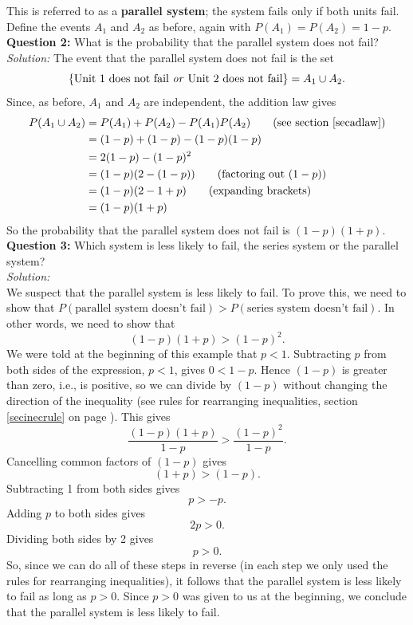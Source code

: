 \noindent This is referred to as a \textbf{parallel system}; the system fails only if both units fail. Define the events $A_1$ and $A_2$ as before, again with $P(A_1) = P(A_2) = 1-p$. \\

\noindent \textbf{Question 2:} What is the probability that the parallel system does not fail? \\

\noindent \textit{Solution:}
The event that the parallel system does not fail is the set
\[
\left\{\text{Unit 1 does not fail \textit{or} Unit 2 does not fail}\right\} = A_1 \cup A_2.
\]
Since, as before, $A_1$ and $A_2$ are independent, the addition law gives
\begin{align*}
P(A_1 \cup A_2) & = P(A_1) + P(A_2) - P(A_1)P(A_2) \tag{see section \ref{secadlaw}} \\
			& = (1-p) + (1-p)  - (1-p)(1-p) \\
			& = 2(1-p) - (1-p)^2 \\
			& = (1-p)(2 - (1-p)) \tag{factoring out $(1-p)$} \\
			& = (1-p)(2 - 1 + p) \tag{expanding brackets} \\
			& = (1-p)(1 + p)
\end{align*}
So the probability that the parallel system does not fail is $(1-p)(1+p).$ \\

\noindent \textbf{Question 3:} Which system is less likely to fail, the series system or the parallel system? \\

\noindent \textit{Solution:} \\
We suspect that the parallel system is less likely to fail. To prove this, we need to show that $P(\text{parallel system doesn't fail}) > P(\text{series system doesn't fail})$. In other words, we need to show that
\[
(1-p)(1+p) > (1-p)^2. \tag{using results from questions 1 and 2}
\]
We were told at the beginning of this example that $p < 1$. Subtracting $p$ from both sides of the expression, $p < 1$, gives $0 < 1 - p$. Hence $(1-p)$ is greater than zero, i.e., is positive, so we can divide by $(1-p)$ without changing the direction of the inequality (see rules for rearranging inequalities, section \ref{secinecrule} on page \pageref{secinecrule}). This gives
\[
\frac{(1-p)(1+p)}{1-p} > \frac{(1-p)^2}{1-p}.
\]
Cancelling common factors of $(1-p)$ gives
\[
(1+p) > (1-p).
\]
Subtracting 1 from both sides gives
\[
p > -p.
\]
Adding $p$ to both sides gives
\[
2p > 0.
\]
Dividing both sides by 2 gives
\[
p > 0.
\]
So, since we can do all of these steps in reverse (in each step we only used the rules for rearranging inequalities), it follows that the parallel system is less likely to fail as long as $p > 0$. Since $p > 0$ was given to us at the beginning, we conclude that the parallel system is less likely to fail.

